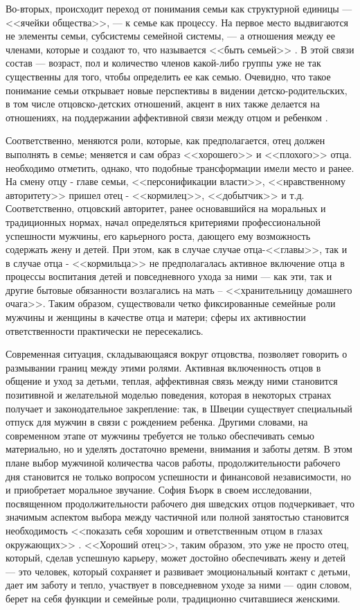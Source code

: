 \documentclass{../../common/thesisbyxetex}
\begin{document}
Во-вторых, происходит переход от понимания семьи как структурной единицы --- <<ячейки общества>>,
--- к семье как процессу. На первое место выдвигаются не элементы семьи, субсистемы семейной
системы, --- а отношения между ее членами, которые и создают то, что называется <<быть семьей>>
\cite{fam}. В этой связи состав  --- возраст, пол и количество  членов какой-либо группы уже не так
существенны для того, чтобы определить  ее как семью. Очевидно, что такое
понимание семьи открывает новые перспективы в видении детско-родительских, в том числе
отцовско-детских отношений, акцент в них также делается на отношениях, на поддержании
аффективной
связи между отцом и ребенком \cite[15]{fatpsy}.

Соответственно, меняются роли, которые, как предполагается, отец должен выполнять в семье; меняется
и сам образ <<хорошего>> и  <<плохого>> отца. необходимо отметить, однако, что подобные
трансформации имели место и ранее. На смену отцу - главе семьи, <<персонификации власти>>,
<<нравственному авторитету>> пришел отец - <<кормилец>>, <<добытчик>> и т.д. Соответственно,
отцовский авторитет, ранее основавшийся на моральных и традиционных нормах, начал определяться
критериями профессиональной успешности мужчины, его карьерного роста, дающего ему возможность
содержать жену и детей. При этом, как в случае случае отца-<<главы>>, так и в случае отца -
<<кормильца>> не предполагалась активное включение отца в процессы воспитания детей и повседневного
ухода за ними --- как эти, так и другие бытовые обязанности возлагались на мать -- <<хранительницу
домашнего очага>>. Таким образом, существовали четко фиксированные семейные роли мужчины и женщины
в качестве отца и матери; сферы их активностии ответственности практически не пересекались.

Современная ситуация, складывающаяся вокруг отцовства, позволяет говорить о размывании границ между
этими ролями. Активная включенность отцов в общение и уход за детьми, теплая, аффективная связь
между ними становится позитивной и желательной моделью поведения, которая в некоторых странах
получает и законодательное закрепление: так, в Швеции существует специальный отпуск для мужчин в
связи с рождением ребенка. Другими словами, на современном  этапе от мужчины требуется не только
обеспечивать семью
материально, но и уделять
достаточно времени, внимания и заботы детям. В этом плане выбор мужчиной количества часов работы,
продолжительности рабочего дня становится не только вопросом успешности и финансовой независимости,
но и приобретает моральное звучание. София Бъорк в своем исследовании, посвященном
продолжительности рабочего дня шведских отцов подчеркивает, что значимым аспектом  выбора
между частичной или полной занятостью становится необходимость <<показать себя хорошим и
ответственным отцом в глазах окружающих>> \cite[221]{morfat}. <<Хороший отец>>, таким образом, это
уже не просто отец, который, сделав успешную карьеру, может достойно обеспечивать жену и детей ---
это человек, который сохраняет и развивает эмоциональный контакт с детьми, дает им заботу и тепло,
участвует в повседневном уходе за ними --- один словом, берет на себя функции и семейные роли,
традиционно считавшиеся женскими.
\end{document}
